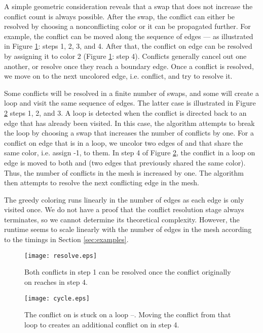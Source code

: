 \documentclass[12pt]{article}
\begin{document}
A simple geometric consideration reveals that a swap that does not increase the conflict count is always possible.  
After the swap, the conflict can either be resolved by choosing a nonconflicting color or it can be propagated further.  
For example, the conflict can be moved along the sequence of edges --- as illustrated in Figure \ref{fig:resolve}: steps 1, 2, 3, and 4.  
After that, the conflict on edge  can be resolved by assigning it to color 2 (Figure \ref{fig:resolve}: step 4).  Conflicts generally cancel out one another, or resolve once they reach a boundary edge.
Once a conflict is resolved, we move on to the next uncolored edge, i.e. conflict, and try to resolve it.  

Some conflicts will be resolved in a finite number of swaps, and some will create a loop and visit the same sequence of edges.  
The latter case is illustrated in Figure \ref{fig:cycle} steps 1, 2, and 3.  
A loop is detected when the conflict is directed back to an edge that has already been visited.  
In this case, the algorithm attempts to break the loop by choosing a swap that increases the number of conflicts by one.  For a conflict on edge  that is in a loop, we uncolor two edges of  and  that share the same color, i.e. assign -1, to them.  
In step 4 of Figure \ref{fig:cycle}, the conflict in a loop on edge  is moved to both  and  (two edges that previously shared the same color).  
Thus, the number of conflicts in the mesh is increased by one.  
The algorithm then attempts to resolve the next conflicting edge in the mesh.




The greedy coloring runs linearly in the number of edges as each edge is only visited once.  We do not have a proof that the conflict resolution stage always terminates, so we cannot determine its theoretical complexity.  However, the runtime seems to scale linearly with the number of edges in the mesh according to the timings in Section \ref{sec:examples}. 


\begin{figure}
	\centering
	\texttt{[image: resolve.eps]}
	\caption{Both conflicts in step 1 can be resolved once the conflict originally on  reaches  in step 4.}
	\label{fig:resolve}
\end{figure}




\begin{figure}
	\centering
	\texttt{[image: cycle.eps]}
	\caption{The conflict on  is stuck on a loop --.  Moving the conflict from that loop to  creates an additional conflict on  in step 4.}
	\label{fig:cycle}
\end{figure}
\end{document}
